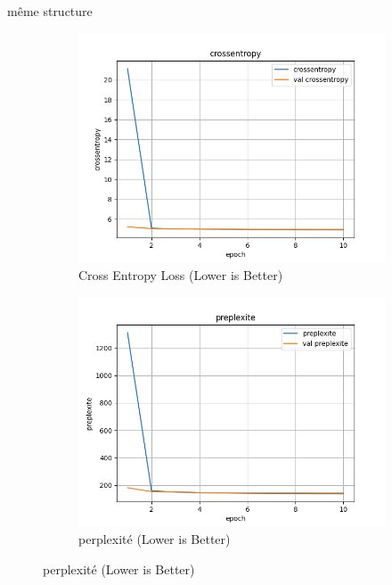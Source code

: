 \documentclass[a4paper]{article}
\begin{document}
même structure

\begin{figure}[ht]
  \centering
  \begin{subfigure}{0.47\textwidth}
    \includegraphics[width=\linewidth]{../logs/learnfromword2vect/crossentropy.png}
    \caption{Cross Entropy Loss (Lower is Better)}
  \end{subfigure}
  \hfill
  \begin{subfigure}{0.47\textwidth}
    \includegraphics[width=\linewidth]{../logs/learnfromword2vect/preplexite.png}
    \caption{perplexité (Lower is Better)}
  \end{subfigure}


\end{figure}
\end{document}
